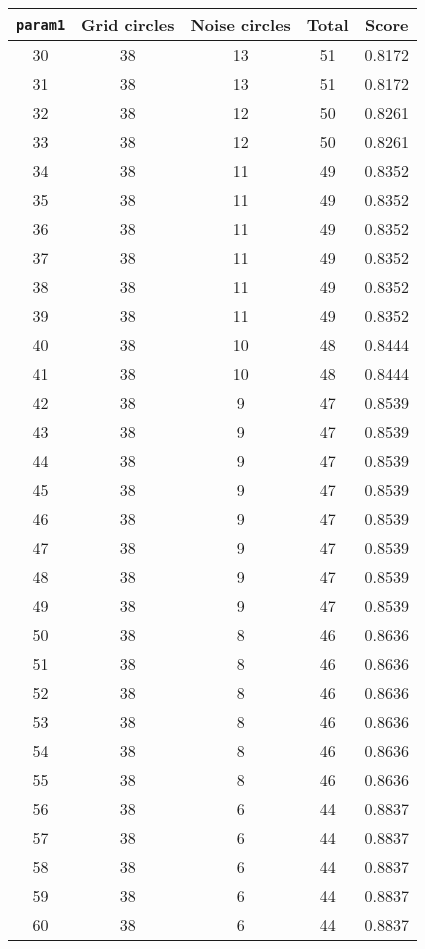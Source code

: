 \documentclass[letterpaper, 12pt]{article}
\begin{document}
\begin{longtable}{|c|c|c|c|c|}
\hline
\textbf{\texttt{param1}} & \textbf{Grid circles} & \textbf{Noise circles} & \textbf{Total} & \textbf{Score} \\
\hline
30 & 38 & 13 & 51 & 0.8172 \\
\hline
31 & 38 & 13 & 51 & 0.8172 \\
\hline
32 & 38 & 12 & 50 & 0.8261 \\
\hline
33 & 38 & 12 & 50 & 0.8261 \\
\hline
34 & 38 & 11 & 49 & 0.8352 \\
\hline
35 & 38 & 11 & 49 & 0.8352 \\
\hline
36 & 38 & 11 & 49 & 0.8352 \\
\hline
37 & 38 & 11 & 49 & 0.8352 \\
\hline
38 & 38 & 11 & 49 & 0.8352 \\
\hline
39 & 38 & 11 & 49 & 0.8352 \\
\hline
40 & 38 & 10 & 48 & 0.8444 \\
\hline
41 & 38 & 10 & 48 & 0.8444 \\
\hline
42 & 38 & 9 & 47 & 0.8539 \\
\hline
43 & 38 & 9 & 47 & 0.8539 \\
\hline
44 & 38 & 9 & 47 & 0.8539 \\
\hline
45 & 38 & 9 & 47 & 0.8539 \\
\hline
46 & 38 & 9 & 47 & 0.8539 \\
\hline
47 & 38 & 9 & 47 & 0.8539 \\
\hline
48 & 38 & 9 & 47 & 0.8539 \\
\hline
49 & 38 & 9 & 47 & 0.8539 \\
\hline
50 & 38 & 8 & 46 & 0.8636 \\
\hline
51 & 38 & 8 & 46 & 0.8636 \\
\hline
52 & 38 & 8 & 46 & 0.8636 \\
\hline
53 & 38 & 8 & 46 & 0.8636 \\
\hline
54 & 38 & 8 & 46 & 0.8636 \\
\hline
55 & 38 & 8 & 46 & 0.8636 \\
\hline
56 & 38 & 6 & 44 & 0.8837 \\
\hline
57 & 38 & 6 & 44 & 0.8837 \\
\hline
58 & 38 & 6 & 44 & 0.8837 \\
\hline
59 & 38 & 6 & 44 & 0.8837 \\
\hline
60 & 38 & 6 & 44 & 0.8837 \\
\hline

\end{longtable}
\end{document}
